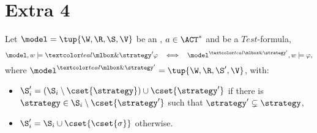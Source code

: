 \section{Extra 4}
\begin{definition}
Let $\model = \tup{\W, \R, \S, \V}$ be an \ults, $a \in \ACT^*$ and  be a $\mathit{Test}$-formula,
\[
\model,w \models \extraopt{\strategy'}\varphi \ \ \iff \ \ \model^{\extraopt{\strategy'}},w \models \varphi,
\] 
where $\model^{\extraopt{\strategy'}} = \tup{\W,\R,\S',\V}$, with:
\begin{itemize}
\item $\S'_i = (\S_i \setminus \cset{\strategy}) \cup \cset{\strategy'}$ if there is $\strategy \in \S_i \setminus \cset{\strategy'}$ such that $\strategy' \subsetneq \strategy$,
\item $\S'_i = \S_i \cup \cset{\cset{\sigma}}$ otherwise.
\end{itemize}
\end{definition}

